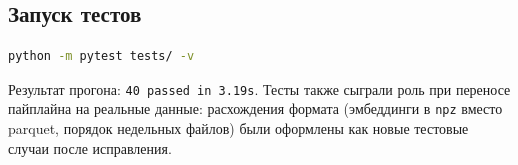 \subsection{Запуск тестов}

\begin{lstlisting}[language=bash, caption={Запуск полного набора тестов}, label={lst:run-tests}]
python -m pytest tests/ -v
\end{lstlisting}

Результат прогона: \texttt{40 passed in 3.19s}.
Тесты также сыграли роль при переносе пайплайна на реальные данные: расхождения формата (эмбеддинги в \texttt{npz} вместо parquet, порядок недельных файлов) были оформлены как новые тестовые случаи после исправления.
